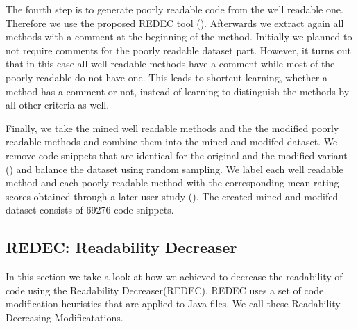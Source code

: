 \documentclass[%
class=scrreprt,
chapterprefix=false,%
open=right,%
twoside=false,%
paper=a4,%
logofile={Logo\_zentral\_farbig\_EN.png},%
thesistype=master,%
UKenglish,%
]{se2thesis}
\theoremstyle{definition}
\newcommand{\numSamplesAccurate}{69276\xspace}
\newcommand{\RDH}{Readability Decreaser\xspace}
\newcommand{\rdh}{REDEC\xspace}
\newcommand{\RDHa}{\RDH (\rdh)\xspace} %
\newcommand{\RDMs}{Readability Decreasing Modificatations\xspace}
\begin{document}
	The fourth step is to generate poorly readable code from the well readable one. Therefore we use the proposed \rdh tool (). Afterwards we extract again all methods with a comment at the beginning of the method.
	Initially we planned to not require comments for the poorly readable dataset part. However, it turns out that in this case all well readable methods have a comment while most of the poorly readable do not have one. This leads to shortcut learning, whether a method has a comment or not, instead of learning to distinguish the methods by all other criteria as well.
	
	Finally, we take the mined well readable methods and the the modified poorly readable methods and combine them into the mined-and-modifed dataset. We remove code snippets that are identical for the original and the modified variant () and balance the dataset using random sampling.
	We label each well readable method and each poorly readable method with the corresponding mean rating scores obtained through a later user study ().
	The created mined-and-modifed dataset consists of \numSamplesAccurate code snippets.
	
\subsection{REDEC: Readability Decreaser} \label{REDEC}
	In this section we take a look at how we achieved to decrease the readability of code using the \RDHa.
	\rdh uses a set of code modification heuristics that are applied to Java files. We call these \RDMs.
	
\end{document}
